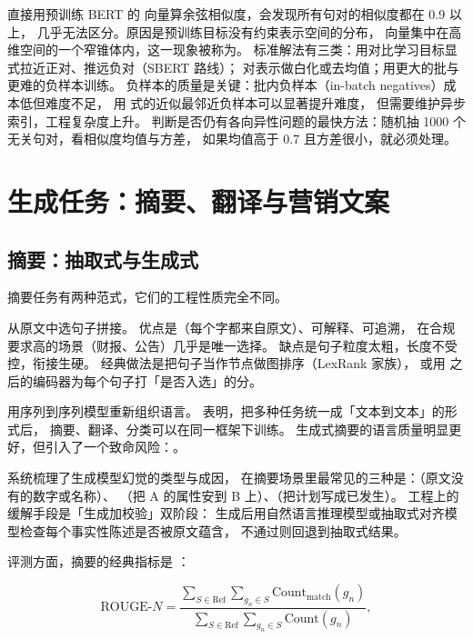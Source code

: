 \begin{insight}
直接用预训练 BERT 的 \code{[CLS]} 向量算余弦相似度，会发现所有句对的相似度都在 0.9 以上，
几乎无法区分。原因是预训练目标没有约束表示空间的分布，
向量集中在高维空间的一个窄锥体内，这一现象被称为。
标准解法有三类：用对比学习目标显式拉近正对、推远负对（SBERT 路线）；
对表示做白化或去均值；用更大的批与更难的负样本训练。
负样本的质量是关键：批内负样本（in-batch negatives）成本低但难度不足，
用 \cite{xiong2020ance} 式的近似最邻近负样本可以显著提升难度，
但需要维护异步索引，工程复杂度上升。
判断是否仍有各向异性问题的最快方法：随机抽 1000 个无关句对，看相似度均值与方差，
如果均值高于 0.7 且方差很小，就必须处理。
\end{insight}

\section{生成任务：摘要、翻译与营销文案}

\subsection{摘要：抽取式与生成式}

摘要任务有两种范式，它们的工程性质完全不同。

 从原文中选句子拼接。
优点是（每个字都来自原文）、可解释、可追溯，
在合规要求高的场景（财报、公告）几乎是唯一选择。
缺点是句子粒度太粗，长度不受控，衔接生硬。
经典做法是把句子当作节点做图排序（LexRank 家族），
或用 \cite{vaswani2017attention} 之后的编码器为每个句子打「是否入选」的分。

 用序列到序列模型重新组织语言。
\cite{raffel2020t5} 表明，把多种任务统一成「文本到文本」的形式后，
摘要、翻译、分类可以在同一框架下训练。
生成式摘要的语言质量明显更好，但引入了一个致命风险：。

\cite{ji2023hallucination} 系统梳理了生成模型幻觉的类型与成因，
在摘要场景里最常见的三种是：（原文没有的数字或名称）、
（把 A 的属性安到 B 上）、（把计划写成已发生）。
工程上的缓解手段是「生成加校验」双阶段：
生成后用自然语言推理模型或抽取式对齐模型检查每个事实性陈述是否被原文蕴含，
不通过则回退到抽取式结果。

评测方面，摘要的经典指标是 ：

\begin{equation}
\text{ROUGE-}N = \frac{\sum_{S \in \text{Ref}} \sum_{g_n \in S} \text{Count}_{\text{match}}(g_n)}
{\sum_{S \in \text{Ref}} \sum_{g_n \in S} \text{Count}(g_n)},
\label{eq:rouge}
\end{equation}

